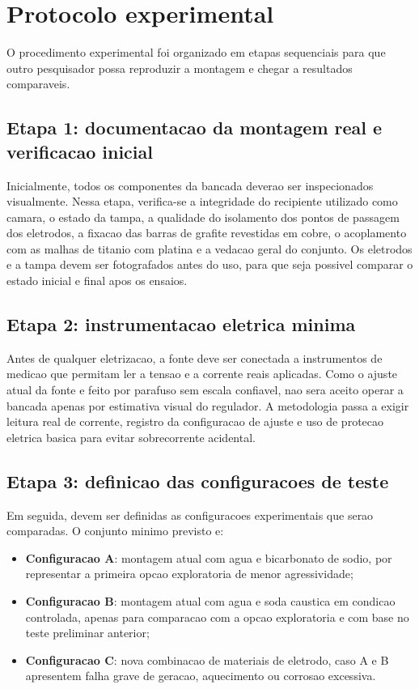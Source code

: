 \documentclass[12pt,oneside,a4paper,brazilian]{abntex2}
\begin{document}
\section{Protocolo experimental}

O procedimento experimental foi organizado em etapas sequenciais para que outro pesquisador possa reproduzir a montagem e chegar a resultados comparaveis.

\subsection{Etapa 1: documentacao da montagem real e verificacao inicial}

Inicialmente, todos os componentes da bancada deverao ser inspecionados visualmente. Nessa etapa, verifica-se a integridade do recipiente utilizado como camara, o estado da tampa, a qualidade do isolamento dos pontos de passagem dos eletrodos, a fixacao das barras de grafite revestidas em cobre, o acoplamento com as malhas de titanio com platina e a vedacao geral do conjunto. Os eletrodos e a tampa devem ser fotografados antes do uso, para que seja possivel comparar o estado inicial e final apos os ensaios.

\subsection{Etapa 2: instrumentacao eletrica minima}

Antes de qualquer eletrizacao, a fonte deve ser conectada a instrumentos de medicao que permitam ler a tensao e a corrente reais aplicadas. Como o ajuste atual da fonte e feito por parafuso sem escala confiavel, nao sera aceito operar a bancada apenas por estimativa visual do regulador. A metodologia passa a exigir leitura real de corrente, registro da configuracao de ajuste e uso de protecao eletrica basica para evitar sobrecorrente acidental.

\subsection{Etapa 3: definicao das configuracoes de teste}

Em seguida, devem ser definidas as configuracoes experimentais que serao comparadas. O conjunto minimo previsto e:

\begin{itemize}
  \item \textbf{Configuracao A}: montagem atual com agua e bicarbonato de sodio, por representar a primeira opcao exploratoria de menor agressividade;
  \item \textbf{Configuracao B}: montagem atual com agua e soda caustica em condicao controlada, apenas para comparacao com a opcao exploratoria e com base no teste preliminar anterior;
  \item \textbf{Configuracao C}: nova combinacao de materiais de eletrodo, caso A e B apresentem falha grave de geracao, aquecimento ou corrosao excessiva.
\end{itemize}
\end{document}
